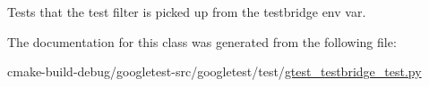 \begin{DoxyVerb}Tests that the test filter is picked up from the testbridge env var.\end{DoxyVerb}
 

The documentation for this class was generated from the following file\+:\begin{DoxyCompactItemize}
\item 
cmake-\/build-\/debug/googletest-\/src/googletest/test/\mbox{\hyperlink{gtest__testbridge__test_8py}{gtest\+\_\+testbridge\+\_\+test.\+py}}\end{DoxyCompactItemize}
